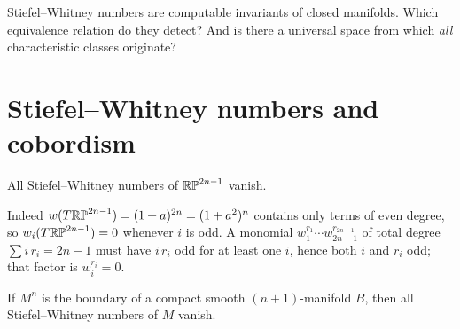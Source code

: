 \lecture

\begin{guiding}
Stiefel--Whitney numbers are computable invariants of closed manifolds. Which
equivalence relation do they detect? And is there a universal space from which
\emph{all} characteristic classes originate?
\end{guiding}

\section{Stiefel--Whitney numbers and cobordism}

\begin{example}\label{ex:odd-RP-numbers}
All Stiefel--Whitney numbers of $\mathbb{RP}^{2n-1}$ vanish.

Indeed $w(T\mathbb{RP}^{2n-1})=(1+a)^{2n}=(1+a^2)^n$ contains only terms of even degree,
so $w_i(T\mathbb{RP}^{2n-1})=0$ whenever $i$ is odd. A monomial
$w_1^{r_1}\cdots w_{2n-1}^{r_{2n-1}}$ of total degree $\sum i\,r_i=2n-1$ must
have $i\,r_i$ odd for at least one $i$, hence both $i$ and $r_i$ odd; that
factor is $w_i^{r_i}=0$.
\end{example}

\begin{theorem}\label{thm:boundary-numbers-vanish}
If $M^n$ is the boundary of a compact smooth $(n+1)$-manifold $B$, then all
Stiefel--Whitney numbers of $M$ vanish.
\end{theorem}

